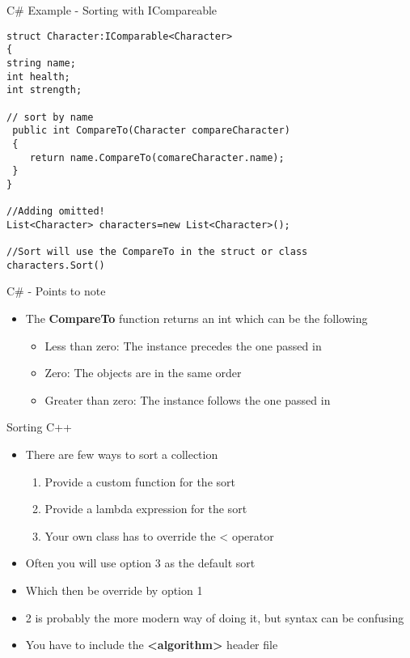 \begin{frame}[fragile]{C\# Example - Sorting with ICompareable }
\begin{lstlisting}
struct Character:IComparable<Character>
{
string name;
int health;
int strength;

// sort by name
 public int CompareTo(Character compareCharacter)
 {
 	return name.CompareTo(comareCharacter.name);
 }
}

//Adding omitted!
List<Character> characters=new List<Character>();

//Sort will use the CompareTo in the struct or class
characters.Sort()
\end{lstlisting}
\end{frame}

\begin{frame}{C\# - Points to note}
	\begin{itemize}
		\pause \item The \textbf{CompareTo} function returns an int which can be the following
		\begin{itemize}
			\pause \item Less than zero: The instance precedes the one passed in
			\pause \item Zero: The objects are in the same order
			\pause \item Greater than zero: The instance follows the one passed in
		\end{itemize} 
	\end{itemize}
\end{frame}

\begin{frame}{Sorting C++}
\begin{itemize}
	\pause \item There are few ways to sort a collection
	\begin{enumerate}
		\pause \item Provide a custom function for the sort
		\pause \item Provide a lambda expression for the sort
		\pause \item Your own class has to override the < operator
	\end{enumerate}
	\pause \item Often you will use option 3 as the default sort
	\pause \item Which then be override by option 1 
	\pause \item 2 is probably the more modern way of doing it, but syntax can be confusing
	\pause \item You have to include the \textbf{<algorithm>} header file
\end{itemize}
\end{frame}
